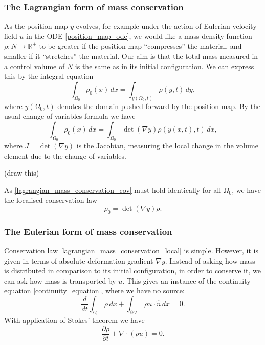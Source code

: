 \documentclass[11pt,a4paper]{memoir}
\newcommand{\omn}{{\Omega_0}}
\newcommand{\pomn}{{\partial\Omega_0}}
\newcommand{\Part}[2]{\frac{\partial #1}{\partial #2}}
\begin{document}
\subsubsection{The Lagrangian form of mass conservation}
As the position map $y$ evolves, for example under the action of Eulerian velocity field $u$ in the ODE \eqref{position_map_ode},
we would like a mass density function $\rho : N \rightarrow \mathbb{R}^+$ to be greater if the position map ``compresses'' the material,
and smaller if it ``stretches'' the material. Our aim is that the total mass measured in a control volume of $N$ is the same as in its initial configuration.
We can express this by the integral equation
\begin{equation}\label{lagrangian_mass_conservation}
    \int_{\omn} \rho_0(x)\,dx = \int_{y(\omn, t)} \rho(y, t)\,dy,
\end{equation}
where $y(\omn, t)$ denotes the domain pushed forward by the position map. By the usual change of variables formula we have
\begin{equation}\label{lagrangian_mass_conservation_cov}
    \int_{\omn} \rho_0(x)\,dx = \int_{\omn} \det(\nabla y)\rho(y(x,t), t)\,dx,
\end{equation}
where $J = \det(\nabla y)$ is the Jacobian, measuring the local change in the volume element due to the change of variables.

\vskip 0.2in
(draw this)
\vskip 0.2in

As \eqref{lagrangian_mass_conservation_cov} must hold identically for all $\Omega_0$, we have the localised conservation law
\begin{equation}\label{lagrangian_mass_conservation_local}
    \rho_0 = \det(\nabla y)\rho.
\end{equation}

\subsubsection{The Eulerian form of mass conservation}
Conservation law \eqref{lagrangian_mass_conservation_local} is simple. However, it is given in terms of absolute deformation gradient $\nabla y$.
Instead of asking how mass is distributed
in comparison to its initial configuration, in order to conserve it, we can ask how mass is transported by $u$.
This gives an instance of the continuity equation \eqref{continuity_equation}, where we have no source:
\begin{equation}\label{eulerian_mass_conservation}
    \frac{d}{dt} \int_{\omn} \rho \,dx + \int_{\pomn} \rho u\cdot \hat{n}\,dx = 0.
\end{equation}
With application of Stokes' theorem we have
\begin{equation}\label{eulerian_mass_conservation_local}
    \Part{\rho}{t} + \nabla \cdot (\rho u) = 0.
\end{equation}
\end{document}
